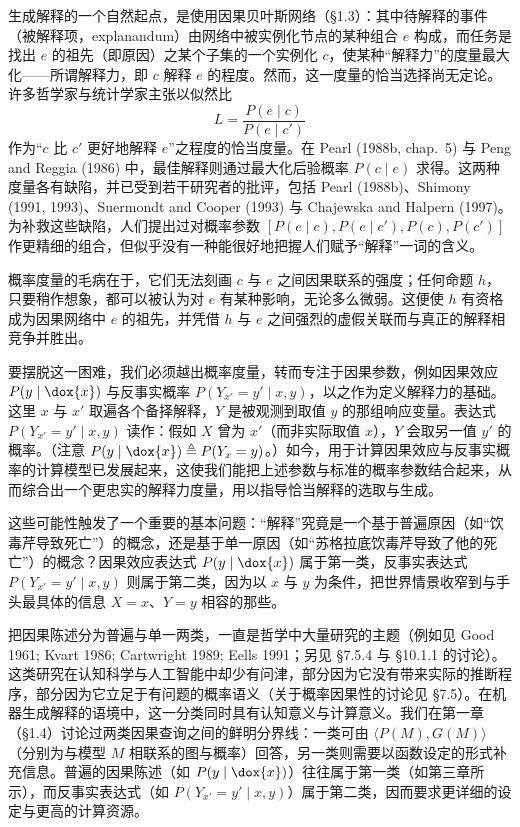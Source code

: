 生成解释的一个自然起点，是使用因果贝叶斯网络（\S 1.3）：其中待解释的事件（被解释项，explanandum）由网络中被实例化节点的某种组合 $e$ 构成，而任务是找出 $e$ 的祖先（即原因）之某个子集的一个实例化 $c$，使某种“解释力”的度量最大化——所谓解释力，即 $c$ 解释 $e$ 的程度。然而，这一度量的恰当选择尚无定论。许多哲学家与统计学家主张以似然比
\[
L=\frac{P(e\mid c)}{P(e\mid c')}
\]
作为“$c$ 比 $c'$ 更好地解释 $e$”之程度的恰当度量。在 Pearl (1988b, chap.~5) 与 Peng and Reggia (1986) 中，最佳解释则通过最大化后验概率 $P(c\mid e)$ 求得。这两种度量各有缺陷，并已受到若干研究者的批评，包括 Pearl (1988b)、Shimony (1991, 1993)、Suermondt and Cooper (1993) 与 Chajewska and Halpern (1997)。为补救这些缺陷，人们提出过对概率参数 $[P(e\mid c),P(e\mid c'),P(c),P(c')]$ 作更精细的组合，但似乎没有一种能很好地把握人们赋予“解释”一词的含义。

概率度量的毛病在于，它们无法刻画 $c$ 与 $e$ 之间因果联系的强度；任何命题 $h$，只要稍作想象，都可以被认为对 $e$ 有某种影响，无论多么微弱。这便使 $h$ 有资格成为因果网络中 $e$ 的祖先，并凭借 $h$ 与 $e$ 之间强烈的虚假关联而与真正的解释相竞争并胜出。

要摆脱这一困难，我们必须越出概率度量，转而专注于因果参数，例如因果效应 $P(y\mid\dox{x})$ 与反事实概率 $P(Y_{x'}=y'\mid x,y)$，以之作为定义解释力的基础。这里 $x$ 与 $x'$ 取遍各个备择解释，$Y$ 是被观测到取值 $y$ 的那组响应变量。表达式 $P(Y_{x'}=y'\mid x,y)$ 读作：假如 $X$ 曾为 $x'$（而非实际取值 $x$），$Y$ 会取另一值 $y'$ 的概率。（注意 $P(y\mid\dox{x})\triangleq P(Y_x=y)$。）如今，用于计算因果效应与反事实概率的计算模型已发展起来，这使我们能把上述参数与标准的概率参数结合起来，从而综合出一个更忠实的解释力度量，用以指导恰当解释的选取与生成。

这些可能性触发了一个重要的基本问题：“解释”究竟是一个基于普遍原因（如“饮毒芹导致死亡”）的概念，还是基于单一原因（如“苏格拉底饮毒芹导致了他的死亡”）的概念？因果效应表达式 $P(y\mid\dox{x})$ 属于第一类，反事实表达式 $P(Y_{x'}=y'\mid x,y)$ 则属于第二类，因为以 $x$ 与 $y$ 为条件，把世界情景收窄到与手头最具体的信息 $X=x$、$Y=y$ 相容的那些。

把因果陈述分为普遍与单一两类，一直是哲学中大量研究的主题（例如见 Good 1961; Kvart 1986; Cartwright 1989; Eells 1991；另见 \S 7.5.4 与 \S 10.1.1 的讨论）。这类研究在认知科学与人工智能中却少有问津，部分因为它没有带来实际的推断程序，部分因为它立足于有问题的概率语义（关于概率因果性的讨论见 \S 7.5）。在机器生成解释的语境中，这一分类同时具有认知意义与计算意义。我们在第一章（\S 1.4）讨论过两类因果查询之间的鲜明分界线：一类可由 $\langle P(M),G(M)\rangle$（分别为与模型 $M$ 相联系的图与概率）回答，另一类则需要以函数设定的形式补充信息。普遍的因果陈述（如 $P(y\mid\dox{x})$）往往属于第一类（如第三章所示），而反事实表达式（如 $P(Y_{x'}=y'\mid x,y)$）属于第二类，因而要求更详细的设定与更高的计算资源。


